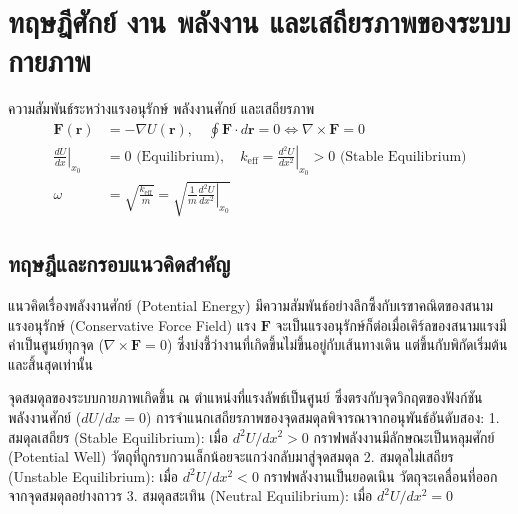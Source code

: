 
\chapter{ทฤษฎีศักย์ งาน พลังงาน และเสถียรภาพของระบบกายภาพ}
\label{ch:chapter03}


\vspace{0.4cm}

\begin{equationsbox}{ความสัมพันธ์ระหว่างแรงอนุรักษ์ พลังงานศักย์ และเสถียรภาพ}
\begin{align}
\mathbf{F}(\mathbf{r}) &= -\nabla U(\mathbf{r}), \quad \oint \mathbf{F}\cdot d\mathbf{r} = 0 \iff \nabla \times \mathbf{F} = 0 \\
\left.\frac{dU}{dx}\right|_{x_0} &= 0 \text{ (Equilibrium)}, \quad k_{\text{eff}} = \left.\frac{d^2U}{dx^2}\right|_{x_0} > 0 \text{ (Stable Equilibrium)} \\
\omega &= \sqrt{\frac{k_{\text{eff}}}{m}} = \sqrt{\frac{1}{m}\left.\frac{d^2U}{dx^2}\right|_{x_0}}
\end{align}
\end{equationsbox}

\section{ทฤษฎีและกรอบแนวคิดสำคัญ}

แนวคิดเรื่องพลังงานศักย์ (Potential Energy) มีความสัมพันธ์อย่างลึกซึ้งกับเรขาคณิตของสนามแรงอนุรักษ์ (Conservative Force Field) แรง $\mathbf{F}$ จะเป็นแรงอนุรักษ์ก็ต่อเมื่อเคิร์ลของสนามแรงมีค่าเป็นศูนย์ทุกจุด ($\nabla \times \mathbf{F} = 0$) ซึ่งบ่งชี้ว่างานที่เกิดขึ้นไม่ขึ้นอยู่กับเส้นทางเดิน แต่ขึ้นกับพิกัดเริ่มต้นและสิ้นสุดเท่านั้น

จุดสมดุลของระบบกายภาพเกิดขึ้น ณ ตำแหน่งที่แรงลัพธ์เป็นศูนย์ ซึ่งตรงกับจุดวิกฤตของฟังก์ชันพลังงานศักย์ ($dU/dx = 0$) การจำแนกเสถียรภาพของจุดสมดุลพิจารณาจากอนุพันธ์อันดับสอง:
1. สมดุลเสถียร (Stable Equilibrium): เมื่อ $d^2U/dx^2 > 0$ กราฟพลังงานมีลักษณะเป็นหลุมศักย์ (Potential Well) วัตถุที่ถูกรบกวนเล็กน้อยจะแกว่งกลับมาสู่จุดสมดุล
2. สมดุลไม่เสถียร (Unstable Equilibrium): เมื่อ $d^2U/dx^2 < 0$ กราฟพลังงานเป็นยอดเนิน วัตถุจะเคลื่อนที่ออกจากจุดสมดุลอย่างถาวร
3. สมดุลสะเทิน (Neutral Equilibrium): เมื่อ $d^2U/dx^2 = 0$


